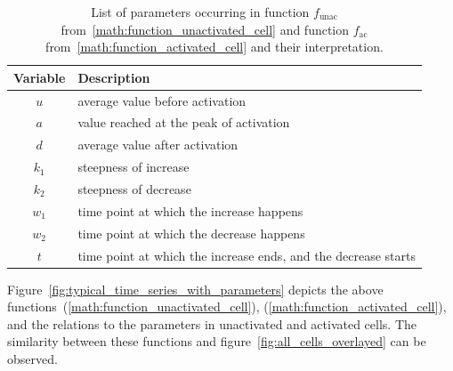 \begin{table}[h!]
	\centering
	\begin{tabular}{|c|l|}
		\hline
		\textbf{Variable} & \textbf{Description}\\
		\hline
		\hline
		$u$ & average value before activation\\
		\hline
		$a$ & value reached at the peak of activation\\
		\hline
		$d$ & average value after activation\\
		\hline
		$k_1$ & steepness of increase\\
		\hline
		$k_2$ & steepness of decrease\\
		\hline
		$w_1$ & time point at which the increase happens\\
		\hline
		$w_2$ & time point at which the decrease happens\\
		\hline
		$t$ & time point at which the increase ends, and the decrease starts\\
		\hline
	\end{tabular}
	\caption{List of parameters occurring in function $f_{\text{unac}}$ from~\ref{math:function_unactivated_cell} and function $f_{\text{ac}}$ from~\ref{math:function_activated_cell} and their interpretation.}
	\label{tab:parameters}
\end{table}

Figure~\ref{fig:typical_time_series_with_parameters} depicts the above functions~(\ref{math:function_unactivated_cell}), (\ref{math:function_activated_cell}), and the relations to the parameters in unactivated and activated cells. The similarity between these functions and figure~\ref{fig:all_cells_overlayed} can be observed.


